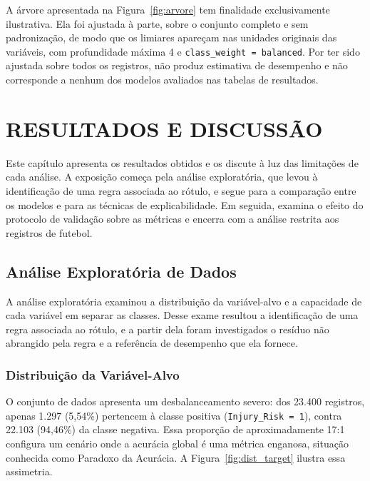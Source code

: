 A árvore apresentada na Figura~\ref{fig:arvore} tem finalidade exclusivamente ilustrativa. Ela foi ajustada à parte, sobre o conjunto completo e sem padronização, de modo que os limiares apareçam nas unidades originais das variáveis, com profundidade máxima 4 e \texttt{class\_weight = balanced}. Por ter sido ajustada sobre todos os registros, não produz estimativa de desempenho e não corresponde a nenhum dos modelos avaliados nas tabelas de resultados.

\chapter{RESULTADOS E DISCUSSÃO}
\label{cap:resultados}

Este capítulo apresenta os resultados obtidos e os discute à luz das limitações de cada análise. A exposição começa pela análise exploratória, que levou à identificação de uma regra associada ao rótulo, e segue para a comparação entre os modelos e para as técnicas de explicabilidade. Em seguida, examina o efeito do protocolo de validação sobre as métricas e encerra com a análise restrita aos registros de futebol.

\section{Análise Exploratória de Dados}

A análise exploratória examinou a distribuição da variável-alvo e a capacidade de cada variável em separar as classes. Desse exame resultou a identificação de uma regra associada ao rótulo, e a partir dela foram investigados o resíduo não abrangido pela regra e a referência de desempenho que ela fornece.

\subsection{Distribuição da Variável-Alvo}
O conjunto de dados apresenta um desbalanceamento severo: dos 23.400 registros, apenas 1.297 (5{,}54\%) pertencem à classe positiva (\texttt{Injury\_Risk = 1}), contra 22.103 (94{,}46\%) da classe negativa. Essa proporção de aproximadamente 17:1 configura um cenário onde a acurácia global é uma métrica enganosa, situação conhecida como Paradoxo da Acurácia. A Figura~\ref{fig:dist_target} ilustra essa assimetria.

